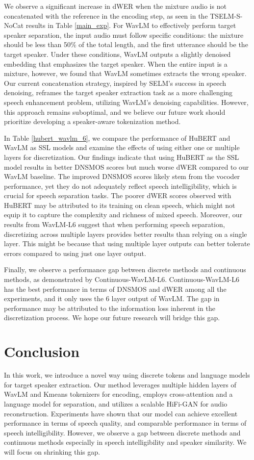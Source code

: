 \documentclass[conference]{IEEEtran}
\begin{document}
We observe a significant increase in dWER when the mixture audio is not concatenated with the reference in the encoding step, as seen in the TSELM-S-NoCat results in Table \ref{main_exp}. For WavLM to effectively perform target speaker separation, the input audio must follow specific conditions: the mixture should be less than 50\% of the total length, and the first utterance should be the target speaker. Under these conditions, WavLM outputs a slightly denoised embedding that emphasizes the target speaker. When the entire input is a mixture, however, we found that WavLM sometimes extracts the wrong speaker.
Our current concatenation strategy, inspired by SELM's \cite{selm} success in speech denoising, reframes the target speaker extraction task as a more challenging speech enhancement problem, utilizing WavLM's denoising capabilities. However, this approach remains suboptimal, and we believe our future work should prioritize developing a speaker-aware tokenization method. 

In Table \ref{hubert_wavlm_6}, we compare the performance of HuBERT and WavLM as SSL models and examine the effects of using either one or multiple layers for discretization. Our findings indicate that using HuBERT as the SSL model results in better DNSMOS scores but much worse dWER compared to our WavLM baseline. The improved DNSMOS scores likely stem from the vocoder performance, yet they do not adequately reflect speech intelligibility, which is crucial for speech separation tasks.
The poorer dWER scores observed with HuBERT may be attributed to its training on clean speech, which might not equip it to capture the complexity and richness of mixed speech. Moreover, our results from WavLM-L6 suggest that when performing speech separation, discretizing across multiple layers provides better results than relying on a single layer.  This might be because that using multiple layer outputs can better tolerate errors compared to using just one layer output.

Finally, we observe a performance gap between discrete methods and continuous methods, as demonstrated by Continuous-WavLM-L6.
Continuous-WavLM-L6 has the best performance in terms of DNSMOS and dWER among all the experiments, and it only uses the 6 layer output of WavLM. 
The gap in performance may be attributed to the information loss inherent in the discretization process. 
We hope our future research will bridge this gap.   

\section{Conclusion}
In this work, we introduce a novel way using discrete tokens and language models for target speaker extraction.
Our method leverages multiple hidden layers of WavLM and Kmeans tokenizers for encoding, employs cross-attention and a language model for separation, and utilizes a scalable HiFi-GAN for audio reconstruction.
Experiments have 
shown that our model can achieve excellent performance in terms of speech quality, and comparable performance in terms of speech intelligibility. However, we observe a gap between discrete methods and continuous methods especially in speech intelligibility and speaker similarity. We will focus on shrinking 
this gap. 
\end{document}

